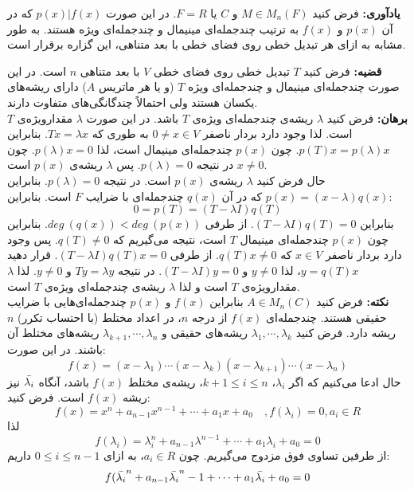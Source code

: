 \textbf{یادآوری:} فرض کنید $M\in M_n(F)$ و $F = R \text{ یا } C$. در این صورت $p(x)|f(x)$ که در آن $p(x)$ و $f(x)$ به ترتیب چند‌جمله‌ای مینیمال و چند‌جمله‌ای ویژه هستند. به طور مشابه به ازای هر تبدیل خطی روی فضا‌ی خطی با بعد متناهی،
این گزاره برقرار است.

\textbf{قضیه:} فرض کنید $T$ تبدیل خطی روی فضا‌ی خطی $V$ با بعد متناهی $n$ است. در این صورت چند‌جمله‌ای مینیمال و چند‌جمله‌ای ویژه $T$ (و یا هر ماتریس $A$) دارای ریشه‌های یکسان هستند ولی احتمالاً چند‌گانگی‌های متفاوت دارند.\\
\textbf{برهان:} فرض کنید $\lambda$ ریشه‌ی چند‌جمله‌ای ویژه‌ی $T$ باشد. در این صورت $\lambda$ مقدار‌ویژه‌ی $T$ است. لذا وجود دارد بردار ناصفر $0\neq x \in V$ به طوری که $Tx = \lambda x$. بنابراین $p(T)x = p(\lambda)x$. چون $p(x)$ چند‌جمله‌ای مینیمال است، لذا $p(\lambda)x =0$. چون $x\neq 0$ در نتیجه $p(\lambda)=0$. پس $\lambda$ ریشه‌ی $p(x)$ است. \\
حال فرض کنید $\lambda$ ریشه‌ی $p(x)$ است. در نتیجه $p(\lambda) =0$. بنابراین $p(x) = (x-\lambda)q(x)$ که در آن $q(x)$ چند‌جمله‌ای با ضرایب $F$ است. بنابراین:
$$0 = p(T) = (T-\lambda I)q(T)$$
بنابراین $(T-\lambda I)q(T) = 0$. از طرفی $deg\: (q(x)) < deg\: (p(x))$. بنابراین چون $p(x)$ چند‌جمله‌ای مینیمال $T$ است، نتیجه می‌گیریم که $q(T)\neq 0$. پس وجود دارد بردار ناصفر $x\in V$ که $q(T)x \neq 0$. از طرفی $(T-\lambda I)q(T)x = 0$. قرار دهید $y=q(T)x$، لذا $y\neq 0$ و $(T-\lambda I)y = 0$. در نتیجه $Ty = \lambda y$ و $y \neq 0$. لذا $\lambda$ مقدار‌ویژه‌ی $T$ است و لذا $\lambda$ ریشه‌ی چند‌جمله‌ای ویژه‌ی $T$ است.\\
\textbf{نکته:} فرض کنید $A \in M_n(C)$ بنابراین $f(x)$ و $p(x)$ چندجمله‌ای‌هایی با ضرایب حقیقی هستند. چند‌جمله‌ای $f(x)$ از درجه $n$، در اعداد مختلط (با احتساب تکرر) $n$ ریشه دارد. فرض کنید $\lambda_1 , \cdots , \lambda_k$ ریشه‌های حقیقی و $\lambda_{k+1} , \cdots , \lambda_n$ ریشه‌های مختلط آن باشند. در این صورت:
$$f(x) = (x-\lambda_1)\cdots(x-\lambda_k)(x-\lambda_{k+1})\cdots(x-\lambda_n)$$
حال ادعا می‌کنیم که اگر $\lambda_i$، $k+1\leq i\leq n$، ریشه‌ی مختلط $f(x)$ باشد، آنگاه $\Bar{\lambda_i}$ نیز ریشه $f(x)$ است. فرض کنید:
$$f(x) = x^n+ a_{n-1}x^{n-1}+ \cdots + a_1x+a_0 \quad , f(\lambda_i) = 0, a_i\in R$$
لذا
$$f(\lambda_i) = \lambda_i^n + a_{n-1}\lambda^{n-1} + \cdots+ a_1\lambda_i + a_0 = 0$$
از طرفین تساوی فوق مزدوج می‌گیریم. چون $a_i\in R$، به ازای $0\leq i \leq n-1$ داریم:
$$f(\Bar{\lambda_i}^n + a_{n-1}\Bar{\lambda_i}^n-1+ \cdots+ a_1\Bar{\lambda_i}+ a_0 = 0$$
